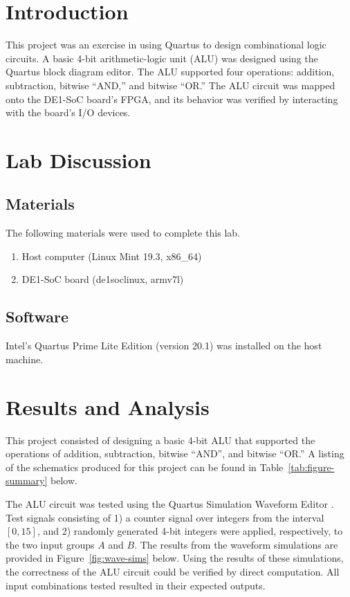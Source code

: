 \documentclass[11pt, letterpaper]{article} %
\begin{document}
\makelabtitle

\section*{Introduction}

This project was an exercise in using Quartus to design combinational logic circuits.
A basic 4-bit arithmetic-logic unit (ALU) was designed using the Quartus block diagram editor. The ALU supported four operations: addition, subtraction, bitwise ``AND,'' and bitwise ``OR.''  The ALU circuit was mapped onto the DE1-SoC board's FPGA, and its behavior was verified by interacting with the board's I/O devices.

\section*{Lab Discussion}

\subsection*{Materials}

The following materials were used to complete this lab.
\begin{enumerate}
    \item Host computer (Linux Mint 19.3, x86\_64)
    \item DE1-SoC board (de1soclinux, armv7l)
\end{enumerate}
\subsection*{Software}
Intel's Quartus Prime Lite Edition (version 20.1) was installed on the host machine.



\section*{Results and Analysis}

This project consisted of designing a basic 4-bit ALU that supported the operations of addition, subtraction, bitwise ``AND'', and bitwise ``OR.'' A listing of the schematics produced for this project can be found in Table~\ref{tab:figure-summary} below.


The ALU circuit was tested using the Quartus Simulation Waveform Editor \cite{quartus-waveform-sim}. Test signals consisting of 1) a counter signal over integers from the interval $[0,15]$, and 2) randomly generated 4-bit integers were applied, respectively, to the two input groups  $A$ and $B$.  The results from the waveform simulations are provided in Figure~\ref{fig:wave-sims} below. Using the results of these simulations, the correctness of the ALU circuit could be verified by direct computation. All input combinations tested resulted in their expected outputs.
\end{document}
